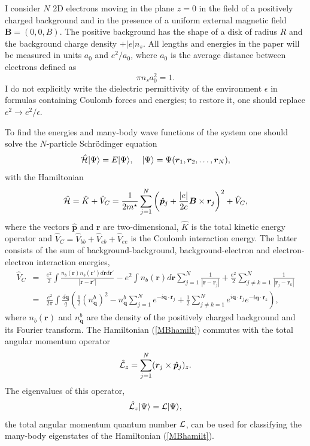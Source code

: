 \documentclass[aps,prb,10pt%
]{revtex4-2}
\def\be{\begin{equation}}
\def\ee{\end{equation}}
\def\ba{\begin{eqnarray}}
\def\ea{\end{eqnarray}}
\begin{document}
I consider $N$ 2D electrons moving in the plane $z=0$ in the field of a positively charged background and in the presence of a uniform external magnetic field $\bm B=(0,0,B)$. The positive background has the shape of a disk of radius $R$ and the background charge density $+|e|n_s$. All lengths and energies in the paper will be measured in units $a_0$ and $e^2/a_0$, where $a_0$ is the average distance between electrons defined as 
\be 
\pi n_sa_0^2=1. \label{def-a0}
\ee
I do not explicitly write the dielectric permittivity of the environment $\epsilon$ in formulas containing Coulomb forces and energies; to restore it, one should replace $e^2\to e^2/\epsilon$.

To find the energies and many-body wave functions of the system one should solve the $N$-particle Schr\"odinger equation
\be 
\hat {\cal H}|\Psi\rangle=E|\Psi\rangle,\ \ \ |\Psi\rangle=\Psi(\bm r_1,\bm r_2,\dots,\bm r_N),
\label{NbodySchrEq}
\ee
with the Hamiltonian 
\be 
\hat {\cal H}=\hat K+\hat V_C =\frac{1}{2m^\star}\sum_{j=1}^N\left(\hat {\bm p}_j+\frac {|e|}{2c}{\bm B}\times{\bm
r}_j\right)^2 +\hat V_C ,
\label{MBhamilt}
\ee
where the vectors $\hat {\bm p}$ and $\bm r$ are two-dimensional, $\hat K$ is the total kinetic energy operator and $\hat V_C=\hat V_{bb}+\hat V_{eb}+\hat V_{ee}$ is the Coulomb interaction energy. The latter consists of the sum of background-background, background-electron and electron-electron interaction energies, 
\ba 
\hat V_C
&=&\frac{e^2}{2}\int \frac{n_b(\bm r)n_b(\bm r')d\bm r d\bm r'}{|\bm r-\bm r'|}
-e^2 \int n_b(\bm r) d\bm r\sum_{j=1}^N \frac 1{|\bm r-\bm r_j|}
+\frac{e^2}{2}\sum_{j\neq k=1}^N \frac 1{|\bm r_j-\bm r_k|}
\nonumber \\
&=&\frac{e^2}{2\pi} \int \frac{d\bm q}{q}
\left(
\frac{1}{2}\left(n_{\bm q}^b\right)^2 
- n_{\bm q}^b \sum_{j=1}^N  e^{-i\bm q\cdot \bm r_j}
+\frac{1}{2}\sum_{j\neq k=1}^N e^{i\bm q\cdot \bm r_j} e^{-i\bm q\cdot \bm r_k}
\right),
\label{CoulombEnergy}
\ea
where $n_b(\bm r)$ and $n_{\bm q}^b$ are the density of the positively charged background and its Fourier transform. The Hamiltonian (\ref{MBhamilt}) commutes with the total angular momentum operator 
\be 
\hat {\cal L}_z=\sum_{j=1}^N({\bm r}_j \times \hat {\bm p}_j)_z.
\ee
The eigenvalues of this operator, 
\be 
\hat {\cal L}_z|\Psi\rangle={\cal L}|\Psi\rangle,\label{LtotDefinition}
\ee 
the total angular momentum quantum number ${\cal L}$, can be used for classifying the many-body eigenstates of the Hamiltonian (\ref{MBhamilt}).
\end{document}
